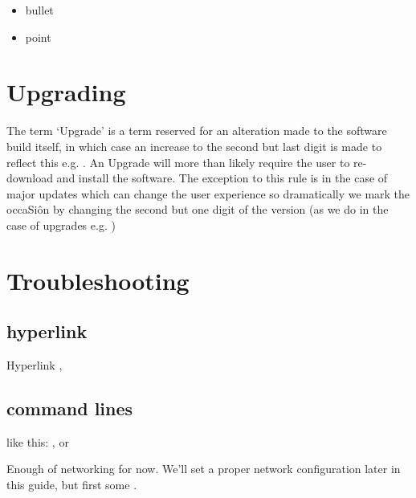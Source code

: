 \documentclass[letterpaper,10pt,english]{sphinxmanual}
\begin{document}
\begin{itemize}
\item {} 
bullet

\item {} 
point

\end{itemize}


\section{Upgrading}
\label{\detokenize{upgrading:upgrading}}\label{\detokenize{upgrading::doc}}
The term ‘Upgrade’ is a term reserved for an alteration made to the software build itself, in which case an increase to the second but last digit is made to reflect this e.g. .  An Upgrade will more than likely require the user to re-download and install the software. The exception to this rule is in the case of major updates which can change the user experience so dramatically we mark the occaSiôn by changing the second but one digit of the version (as we do in the case of upgrades e.g. )


\section{Troubleshooting}
\label{\detokenize{troubleshooting:troubleshooting}}\label{\detokenize{troubleshooting::doc}}

\subsection{hyperlink}
\label{\detokenize{troubleshooting:hyperlink}}
Hyperlink ,


\subsection{command lines}
\label{\detokenize{troubleshooting:command-lines}}
like this: ,  or

Enough of networking for now. We’ll set a proper network configuration later in this guide, but first some .
\end{document}
